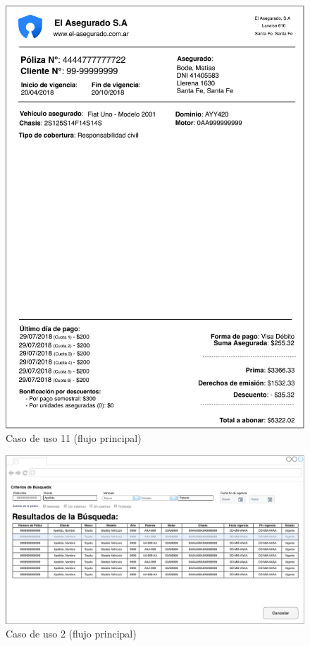 \documentclass[12pt]{article}
\begin{document}
\vfill
\begin{figure}[h!]
\includegraphics[width=\textwidth]{CU11/CU-112.pdf}
\caption{Caso de uso 11 (flujo principal)}
\end{figure}
\vfill


\vfill
\begin{figure}[h!]
\includegraphics[width=\textwidth]{CU2/CU-024.pdf}
\caption{Caso de uso 2 (flujo principal)}
\end{figure}
\vfill
\end{document}
